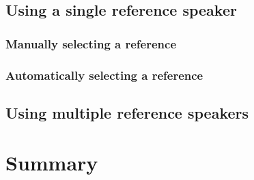 	\subsection{Using a single reference speaker}
		\subsubsection{Manually selecting a reference}
		\subsubsection{Automatically selecting a reference}
	\subsection{Using multiple reference speakers}
		
\section{Summary}